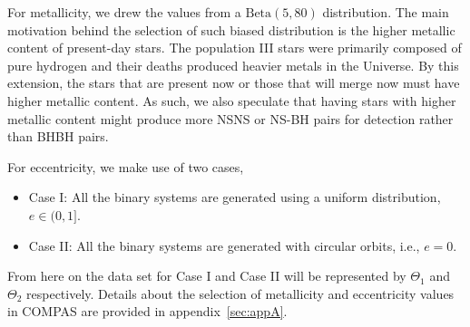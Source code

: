 \documentclass[journal, twocolumns]{IEEEtran}
\begin{document}
    For metallicity, we drew the values from a $\text{Beta}(5, 80)$ distribution.
    The main motivation behind the selection of such biased distribution is the higher metallic content of present-day stars.
    The population III stars were primarily composed of pure hydrogen and their deaths produced heavier metals in the Universe.
    By this extension, the stars that are present now or those that will merge now must have higher metallic content.
    As such, we also speculate that having stars with higher metallic content might produce more NSNS or NS-BH pairs for detection rather than BHBH pairs.

    For eccentricity, we make use of two cases,
    \begin{itemize}
        \item Case I: All the binary systems are generated using a uniform distribution, $e \in (0, 1]$.
        \item Case II: All the binary systems are generated with circular orbits, i.e., $e = 0$.
    \end{itemize}

    From here on the data set for Case I and Case II will be represented by $\Theta_1$ and $\Theta_2$ respectively.
    Details about the selection of metallicity and eccentricity values in COMPAS are provided in appendix~\ref{sec:appA}.
\end{document}

